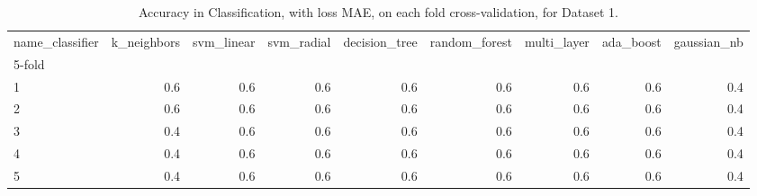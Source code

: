\begin{table}
\centering
\caption{Accuracy in Classification, with loss MAE, on each fold cross-validation, for Dataset 1.}
\label{table:acc-mae-boon-fold-2}
\begin{tabular}{lrrrrrrrr}
\toprule
name\_classifier &  k\_neighbors &  svm\_linear &  svm\_radial &  decision\_tree &  random\_forest &  multi\_layer &  ada\_boost &  gaussian\_nb \\
5-fold &              &             &             &                &                &              &            &              \\
\midrule
1      &          0.6 &         0.6 &         0.6 &            0.6 &            0.6 &          0.6 &        0.6 &          0.4 \\
2      &          0.6 &         0.6 &         0.6 &            0.6 &            0.6 &          0.6 &        0.6 &          0.4 \\
3      &          0.4 &         0.6 &         0.6 &            0.6 &            0.6 &          0.6 &        0.6 &          0.4 \\
4      &          0.4 &         0.6 &         0.6 &            0.6 &            0.6 &          0.6 &        0.6 &          0.4 \\
5      &          0.4 &         0.6 &         0.6 &            0.6 &            0.6 &          0.6 &        0.6 &          0.4 \\
\bottomrule
\end{tabular}
\end{table}
